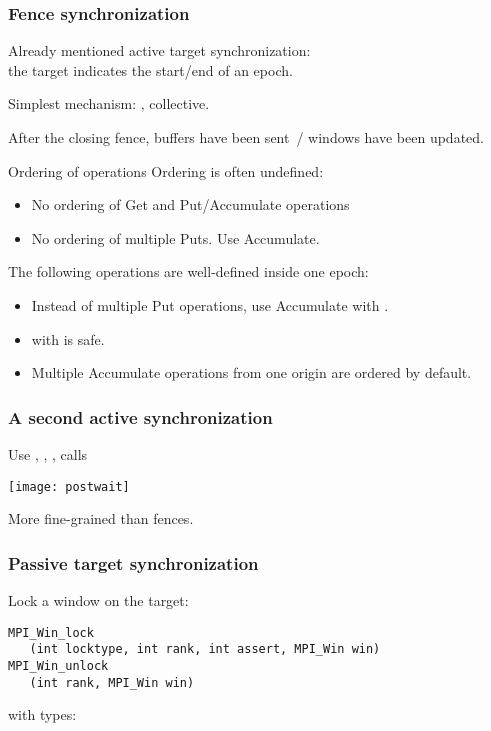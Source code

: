 
\begin{frame}[containsverbatim]\frametitle{Fence synchronization}
  Already mentioned active target synchronization:\\
  the target indicates the start/end of an epoch.

  Simplest mechanism: , collective.  

  After the closing fence, buffers have been sent~/ windows have been updated.
\end{frame}

\begin{frame}[containsverbatim]{Ordering of operations}
  Ordering is often undefined:
  \begin{itemize}
  \item No ordering of Get and Put/Accumulate operations
  \item No ordering of multiple Puts. Use Accumulate.
  \end{itemize}
  The following operations are well-defined inside one epoch:
  \begin{itemize}
  \item Instead of multiple Put operations, use Accumulate with
    .
  \item {} with
     is safe.
  \item Multiple Accumulate operations from one origin are ordered by
    default.
  \end{itemize} 
\end{frame}

\begin{optexerciseframe}[countdown]
  
\end{optexerciseframe}

\begin{frame}[containsverbatim]\frametitle{A second active synchronization}
  Use , ,
  ,  calls

  \texttt{[image: postwait]}

  More fine-grained than fences.
\end{frame}


\begin{frame}[containsverbatim]\frametitle{Passive target synchronization}
  Lock a window on the target:
\lstset{language=C}
\begin{lstlisting}
MPI_Win_lock
   (int locktype, int rank, int assert, MPI_Win win)
MPI_Win_unlock
   (int rank, MPI_Win win)
\end{lstlisting}
  with types:   
\end{frame}

\endinput

\begin{frame}[containsverbatim]\frametitle{}
\begin{lstlisting}
  
\end{lstlisting}
\end{frame}

